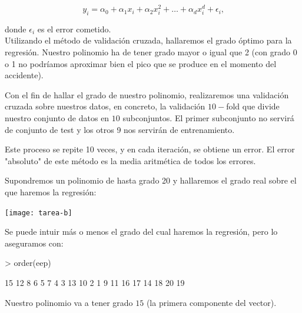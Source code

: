 \documentclass[a4paper,12pt]{article}
\begin{document}
\begin{equation*}
y_i = \alpha_0 + \alpha_1 x_i + \alpha_2 x_i^2 +  \dots + \alpha_d x_i^d + \epsilon_i\text{,}
\end{equation*}

donde $\epsilon_i$ es el error cometido.\\

Utilizando el m\'etodo de validaci\'on cruzada, hallaremos el grado \'optimo para la regresi\'on. Nuestro polinomio ha de tener grado mayor o igual que 2 (con grado 0 o 1 no podríamos aproximar bien el pico que se produce en el momento del accidente). 

Con el fin de hallar el grado de nuestro polinomio, realizaremos una validación cruzada sobre nuestros datos, en concreto, la validación $10-$fold que divide nuestro conjunto de datos en $10$ subconjuntos. El primer subconjunto no servirá de conjunto de test y los otros 9 nos servirán de entrenamiento. 

Este proceso se repite 10 veces, y en cada iteración, se obtiene un error. El error "absoluto" de este método es la media aritmética de todos los errores.

Supondremos un polinomio de hasta grado 20 y hallaremos el grado real sobre el que haremos la regresión:\\


\begin{Schunk}
\end{Schunk}
\texttt{[image: tarea-b]}


Se puede intuir m\'as o menos el grado del cual haremos la regresi\'on, pero lo aseguramos con:

\begin{Schunk}
\begin{Sinput}
> order(eep)
\end{Sinput}
\begin{Soutput}
 [1] 15 12  8  6  5  7  4  3 13 10  2  1  9 11 16 17 14 18 20 19
\end{Soutput}
\end{Schunk}

Nuestro polinomio va a tener grado $15$ (la primera componente del vector).
\end{document}
